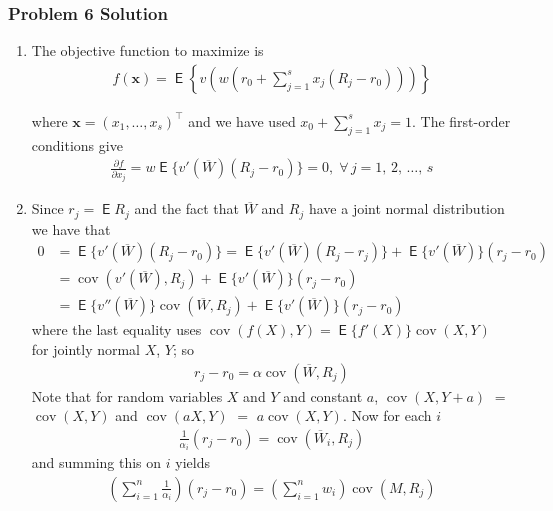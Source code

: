 \documentclass[10pt,handout]{beamer}
\newcommand{\ds}{\displaystyle}
\DeclareMathOperator\expc{\mathsf{E}}
\DeclareMathOperator\cov{cov}
\theoremstyle{definition}
\begin{document}
\begin{frame}[allowframebreaks]
  \frametitle{Problem 6 Solution}
  \begin{enumerate}
    \item The objective function to maximize is \vspace{-2mm}
      \begin{align*}
        f(\mathbf{x}) = \expc\left\{v\left(w\left(r_0 + \sum_{j=1}^s x_j(R_j - r_0)\right)\right)\right\}
      \end{align*}
      \vspace{-4mm}

      where $\mathbf{x} = (x_1,\ldots,x_s)^\top$ and we have used $\ds x_0 + \sum_{j=1}^s x_j = 1$. The first-order conditions give 
      \begin{align*}
        \frac{\partial f}{\partial x_j} = w\expc\big\{v'(\overline{W})(R_j - r_0)\big\} = 0, \;\forall\,j = 1,\,2,\,\ldots,\,s
      \end{align*}
    \item Since $r_j = \expc{R_j}$ and the fact that $\overline{W}$ and $R_j$ have a joint normal distribution we have that
      \begin{align*}
        0 &= \expc\big\{v'(\overline{W})(R_j - r_0)\big\} = \expc\big\{v'(\overline{W})(R_j - r_j)\big\} + \expc\big\{v'(\overline{W})\big\}(r_j - r_0) \\
          &= \cov(v'(\overline{W}), R_j) + \expc\big\{v'(\overline{W})\big\}(r_j - r_0) \\
          &= \expc\big\{v''(\overline{W})\big\}\cov(\overline{W}, R_j) + \expc\big\{v'(\overline{W})\big\}(r_j - r_0)
        \end{align*}
        where the last equality uses $\ds\cov(f(X), Y) = \expc\big\{f'(X)\big\}\cov(X, Y)$ for jointly normal $X$, $Y$; so 
      \begin{align*}
        r_j - r_0 = \alpha \cov(\overline{W}, R_j)
      \end{align*}
      Note that for random variables $X$ and $Y$ and constant $a$, $\cov(X, Y + a)$ $=$ $\cov(X, Y)$ and $\cov(aX, Y)$ $=$ $a\cov(X,Y)$. Now for each $i$
      \begin{align*}
        \frac{1}{\alpha_i}(r_j - r_0) = \cov(\overline{W}_{\!\!i}, R_j)
      \end{align*}
      and summing this on $i$ yields
      \begin{align*}
        \left(\sum_{i=1}^n\frac{1}{\alpha_i}\right)(r_j - r_0) = \left(\sum_{i=1}^n w_i\right)\cov(M\!,R_j)
      \end{align*}

\end{enumerate}
\end{frame}
\end{document}
